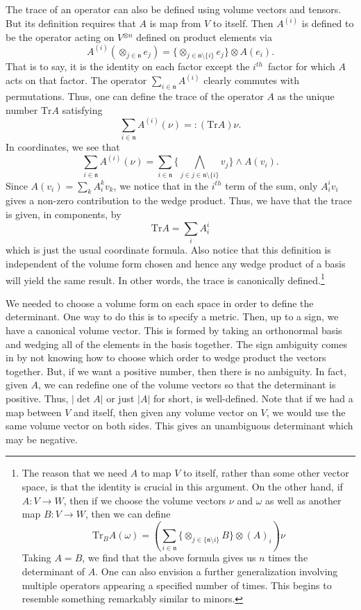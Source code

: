 \documentclass[11pt]{article}
\theoremstyle{remark}
\begin{document}
The trace of an operator can also be defined using volume vectors and
tensors. But its definition requires that $A$ is map from $V$ to
itself. Then $A^{(i)}$ is defined to be 
the operator acting on $V\ensuremath{^{\otimes n} }$ defined
on product elements via
\[
A^{(i)}  (\mathop{\otimes}_{j \in \ensuremath{\mathfrak{n}}} e_j) = \{\mathop{\otimes}_{j \in \ensuremath{\mathfrak{n}}
\setminus {\{i\}} } e_j \} \otimes A(e_i).
\]
That is to say, it is the identity on each factor except the \ensuremath{{i}^{th}}\
factor for which $A$ acts on that factor.
The operator $\sum_{i \in \ensuremath{\mathfrak{n}}} A^{(i)}$  clearly commutes with
permutations. Thus, one can define the trace of the operator $A$ as
the unique number $\ensuremath{\textrm{Tr}} A$ satisfying 
\[
\sum_{i \in \ensuremath{\mathfrak{n}}} A^{(i)} (\nu) \ensuremath{=:} (\ensuremath{\textrm{Tr}} A) \nu.
\] 
In coordinates, we see that 
\[
\sum_{i \in \ensuremath{\mathfrak{n}}} A^{(i)} (\nu) = \sum_{i \in \ensuremath{\mathfrak{n}}} \{\bigwedge_{j
\in j \in \ensuremath{\mathfrak{n}}
\setminus {\{i\}}} v_j \} \wedge A(v_i).
\]
Since $A(v_i) = \sum_k A_i^k v_k$, we notice that in the \ensuremath{{i}^{th}} term of
the sum, only $A_i^i v_i$ gives a non-zero contribution to the wedge
product. Thus, we have that the trace is given, in components, by 
\[
\ensuremath{\textrm{Tr}} A = \sum_i A_i^i
\]
which is just the usual coordinate formula. Also notice that this
definition is independent of the volume form chosen and hence any
wedge product of a basis will yield the same result. In other words,
the trace is canonically defined.\footnote{The reason that we need $A$ to map
$V$ to itself, rather than some other vector space, is that the
identity is crucial in this argument. On the other hand, if $A: V \to
W$, then if we choose the volume vectors $\nu$ and $\omega$ as well as
another map $B: V \to W$, then we can define 
\[
\ensuremath{\textrm{Tr}}_B A (\omega) = (\sum_{i \in \ensuremath{\mathfrak{n}}} \{\mathop{\otimes}_{j \in \{\ensuremath{\mathfrak{n}}
\setminus i\} }B \} \otimes (A)_i) \nu
\]
Taking $A =B$, we find that the above formula gives us $n$ times the
determinant of $A$.  One can also envision a further generalization
involving multiple operators appearing a specified number of
times. This begins to resemble something remarkably similar to minors.
}

We needed to choose a volume form on each space in order 
to define the determinant. One way to do this is to specify a
metric. Then, up to a sign, we have a canonical volume vector. This is
formed by taking an orthonormal basis and wedging all of the elements
in the basis together. The sign ambiguity comes in by not knowing how
to choose which order to wedge product the vectors together. But, if
we want a positive number, then there is no ambiguity. In fact, given
$A$, we can redefine one of the volume vectors so that the determinant
is positive. Thus, $\ensuremath{\lvert {\det A} \rvert}$ or just $\ensuremath{\lvert {A} \rvert}$ for short, is
well-defined. 
Note that if we had a map between $V$ and itself, then given
any volume vector on $V$, we would use the same volume vector on both
sides. This gives an unambiguous determinant which may be negative.  
\end{document}
